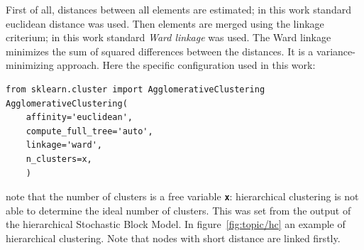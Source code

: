 First of all, distances between all elements are estimated; in this work standard euclidean distance was used. Then elements are merged using the linkage criterium; in this work standard \textit{Ward linkage} was used. The Ward linkage minimizes the sum of squared differences between the distances. It is a variance-minimizing approach. Here the specific configuration used in this work:
\begin{lstlisting}[style=mypython]
from sklearn.cluster import AgglomerativeClustering
AgglomerativeClustering(
    affinity='euclidean',
    compute_full_tree='auto',
    linkage='ward',
    n_clusters=x,
    )
\end{lstlisting}
note that the number of clusters is a free variable \texttt{\textbf{x}}: hierarchical clustering is not able to determine the ideal number of clusters. This was set from the output of the hierarchical Stochastic Block Model.
In figure~\ref{fig:topic/hc} an example of hierarchical clustering. Note that nodes with short distance are linked firstly.
